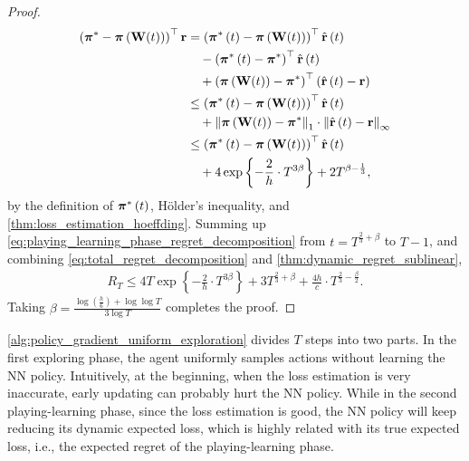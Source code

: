 \begin{proof}
\begin{equation}
\begin{split}
    \left( {{\boldsymbol{\pi}}^*} - {\boldsymbol{\pi}}\left( {\mathbf{W}}(t) \right) \right)^\top {\mathbf{r}} &= \left( {{\boldsymbol{\pi}}^*\left(t\right)} - {\boldsymbol{\pi}}\left( {\mathbf{W}}(t) \right) \right)^\top \hat{{\mathbf{r}}}\left(t\right) \\
    &\quad - \left( {{\boldsymbol{\pi}}^*\left(t\right)} - {{\boldsymbol{\pi}}^*} \right)^\top \hat{{\mathbf{r}}}\left(t\right) \\
    &\quad + \left( {\boldsymbol{\pi}}\left( {\mathbf{W}}(t) \right) - {{\boldsymbol{\pi}}^*}\right)^\top \left( \hat{{\mathbf{r}}}\left(t\right) - {\mathbf{r}} \right) \\
    &\le \left( {{\boldsymbol{\pi}}^*\left(t\right)} - {\boldsymbol{\pi}}\left( {\mathbf{W}}(t) \right) \right)^\top \hat{{\mathbf{r}}}\left(t\right) \\
    &\quad + \left\| {\boldsymbol{\pi}}\left( {\mathbf{W}}(t) \right) - {\boldsymbol{\pi}}^* \right\|_1 \cdot \left\| \hat{{\mathbf{r}}}\left(t\right) - {\mathbf{r}} \right\|_\infty  \\
    &\le \left( {{\boldsymbol{\pi}}^*\left(t\right)} - {\boldsymbol{\pi}}\left( {\mathbf{W}}(t) \right) \right)^\top \hat{{\mathbf{r}}}\left(t\right) \\
    &\quad + 4 \exp\left\{ - \frac{2}{h} \cdot  T^{3\beta} \right\} + 2 T^{\beta - \frac{1}{3}},
\end{split}
\end{equation}
by the definition of ${\boldsymbol{\pi}}^*\left(t\right)$, H{\"o}lder's inequality, and \cref{thm:loss_estimation_hoeffding}. Summing up \cref{eq:playing_learning_phase_regret_decomposition} from $t = T^{\frac{2}{3} + \beta}$ to $T - 1$, and
combining \cref{eq:total_regret_decomposition} and \cref{thm:dynamic_regret_sublinear},
\begin{equation*}
\begin{split}
    R_T \le  4 T \exp\left\{ - \frac{2}{h} \cdot  T^{3\beta} \right\} + 3 T^{\frac{2}{3} + \beta} + \frac{4 h}{ c} \cdot T^{\frac{2}{3} - \frac{\beta}{2}}.
\end{split}
\end{equation*}
Taking $\beta = \frac{ \log{\left(\frac{h}{6}\right) + \log{\log{T}} } }{ 3 \log{T}} $ completes the proof.
\end{proof}

\cref{alg:policy_gradient_uniform_exploration} divides $T$ steps into two parts. In the first exploring phase, the agent uniformly samples actions without learning the NN policy. Intuitively, at the beginning, when the loss estimation is very inaccurate, early updating can probably hurt the NN policy.  While in the second playing-learning phase, since the loss estimation is good, the NN policy will keep reducing its dynamic expected loss, which is highly related with its true expected loss, i.e., the expected regret of the playing-learning phase.

